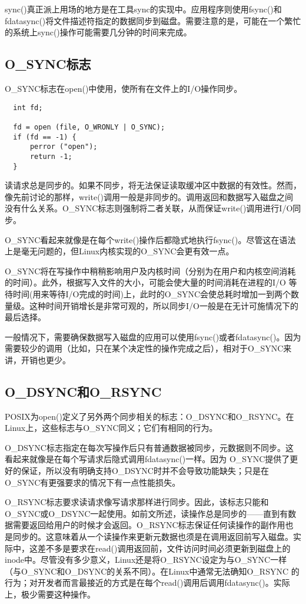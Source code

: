 sync()真正派上用场的地方是在工具sync的实现中。应用程序则使用fsync()和fdatasync()将文件描述符指定的数据同步到磁盘。需要注意的是，可能在一个繁忙的系统上sync()操作可能需要几分钟的时间来完成。 

\subsection{O\_SYNC标志}

O\_SYNC标志在open()中使用，使所有在文件上的I/O操作同步。

\begin{lstlisting}
  int fd;

  fd = open (file, O_WRONLY | O_SYNC);
  if (fd == -1) {
      perror ("open");
      return -1;
  }
\end{lstlisting}

读请求总是同步的。如果不同步，将无法保证读取缓冲区中数据的有效性。然而，像先前讨论的那样，write()调用一般是非同步的。调用返回和数据写入磁盘之间没有什么关系。O\_SYNC标志则强制将二者关联，从而保证write()调用进行I/O同步。

O\_SYNC看起来就像是在每个write()操作后都隐式地执行fsync()。尽管这在语法上是毫无问题的，但Linux内核实现的O\_SYNC会更有效一点。

O\_SYNC将在写操作中稍稍影响用户及内核时间（分别为在用户和内核空间消耗的时间）。此外，根据写入文件的大小，可能会使大量的时间消耗在进程的I/O 等待时间(用来等待I/O完成的时间)上，此时的O\_SYNC会使总耗时增加一到两个数量级。这种时间开销增长是非常可观的，所以同步I/O一般是在无计可施情况下的最后选择。

一般情况下，需要确保数据写入磁盘的应用可以使用fsync()或者fdatasync()。因为需要较少的调用（比如，只在某个决定性的操作完成之后），相对于O\_SYNC来讲，开销也更少。 

\subsection{O\_DSYNC和O\_RSYNC}

POSIX为open()定义了另外两个同步相关的标志：O\_DSYNC和O\_RSYNC。在Linux上，这些标志与O\_SYNC同义；它们有相同的行为。


O\_DSYNC标志指定在每次写操作后只有普通数据被同步，元数据则不同步。这看起来就像是在每个写请求后隐式调用fdatasync()一样。因为 O\_SYNC提供了更好的保证，所以没有明确支持O\_DSYNC时并不会导致功能缺失；只是在O\_SYNC有更强要求的情况下有一点性能损失。


O\_RSYNC标志要求读请求像写请求那样进行同步。因此，该标志只能和O\_SYNC或O\_DSYNC一起使用。如前文所述，读操作总是同步的——直到有数据需要返回给用户的时候才会返回。O\_RSYNC标志保证任何读操作的副作用也是同步的。这意味着从一个读操作来更新元数据也须是在调用返回前写入磁盘。实际中，这差不多是要求在read()调用返回前，文件访问时间必须更新到磁盘上的inode中。尽管没有多少意义，Linux还是将O\_RSYNC设定为与O\_SYNC一样（与O\_SYNC和O\_DSYNC的关系不同）。在Linux中通常无法确知O\_RSYNC 的行为；对开发者而言最接近的方式是在每个read()调用后调用fdatasync()。实际上，极少需要这种操作。 

